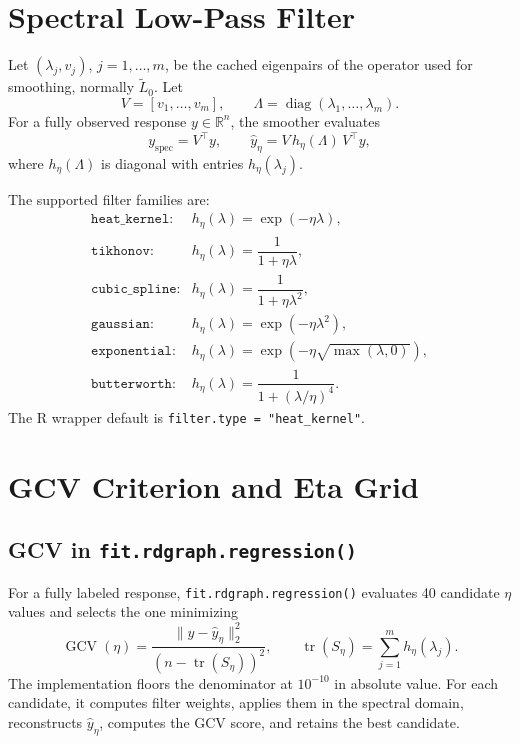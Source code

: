 \documentclass[11pt]{article}
\newcommand{\code}[1]{\texttt{#1}}
\newcommand{\diag}{\operatorname{diag}}
\newcommand{\tr}{\operatorname{tr}}
\begin{document}
\section{Spectral Low-Pass Filter}

Let \((\lambda_j,v_j)\), \(j=1,\ldots,m\), be the cached eigenpairs of the
operator used for smoothing, normally \(\widetilde L_0\). Let
\[
  V = [v_1,\ldots,v_m],
  \qquad
  \Lambda=\diag(\lambda_1,\ldots,\lambda_m).
\]
For a fully observed response \(y\in\mathbb{R}^n\), the smoother evaluates
\[
  y_{\mathrm{spec}} = V^\top y,
  \qquad
  \hat y_\eta
  =
  V\, h_\eta(\Lambda)\, V^\top y,
\]
where \(h_\eta(\Lambda)\) is diagonal with entries \(h_\eta(\lambda_j)\).

The supported filter families are:
\[
\begin{array}{ll}
\texttt{heat\_kernel}:&
  h_\eta(\lambda)=\exp(-\eta\lambda),
\\[0.35em]
\texttt{tikhonov}:&
  h_\eta(\lambda)=\dfrac{1}{1+\eta\lambda},
\\[0.75em]
\texttt{cubic\_spline}:&
  h_\eta(\lambda)=\dfrac{1}{1+\eta\lambda^2},
\\[0.75em]
\texttt{gaussian}:&
  h_\eta(\lambda)=\exp(-\eta\lambda^2),
\\[0.35em]
\texttt{exponential}:&
  h_\eta(\lambda)=\exp(-\eta\sqrt{\max(\lambda,0)}),
\\[0.35em]
\texttt{butterworth}:&
  h_\eta(\lambda)=\dfrac{1}{1+(\lambda/\eta)^4}.
\end{array}
\]
The R wrapper default is \code{filter.type = "heat\_kernel"}.

\section{GCV Criterion and Eta Grid}

\subsection{GCV in \code{fit.rdgraph.regression()}}

For a fully labeled response, \code{fit.rdgraph.regression()} evaluates 40
candidate \(\eta\) values and selects the one minimizing
\[
  \operatorname{GCV}(\eta)
  =
  \frac{\|y-\hat y_\eta\|_2^2}
       {(n-\tr(S_\eta))^2},
  \qquad
  \tr(S_\eta)=\sum_{j=1}^m h_\eta(\lambda_j).
\]
The implementation floors the denominator at \(10^{-10}\) in absolute value.
For each candidate, it computes filter weights, applies them in the spectral
domain, reconstructs \(\hat y_\eta\), computes the GCV score, and retains the
best candidate.
\end{document}
